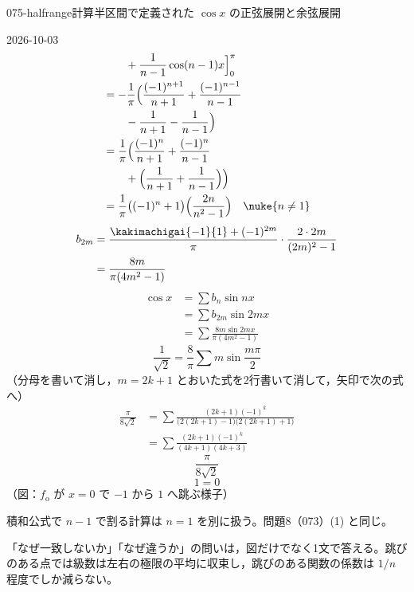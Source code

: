 \documentclass[uplatex,dvipdfmx,a4paper,11pt]{jsarticle}
\begin{document}
\begin{mondai}{075-halfrange}{計算}{半区間で定義された $\cos x$ の正弦展開と余弦展開}
\begin{kotaeutsushi}{2026-10-03}
\begin{align*}
  &\qquad+\frac{1}{n-1}\cos(n-1)x\Bigr]_{0}^{\pi}\\
  &=-\frac{1}{\pi}\Bigl(\frac{(-1)^{n+1}}{n+1}+\frac{(-1)^{n-1}}{n-1}\\
  &\qquad-\frac{1}{n+1}-\frac{1}{n-1}\Bigr)\\
  &=\frac{1}{\pi}\Bigl(\frac{(-1)^{n}}{n+1}+\frac{(-1)^{n}}{n-1}\\
  &\qquad+\Bigl(\frac{1}{n+1}+\frac{1}{n-1}\Bigr)\Bigr)\\
  &=\frac{1}{\pi}\bigl((-1)^{n}+1\bigr)\Bigl(\frac{2n}{n^{2}-1}\Bigr)\quad\nuke{n\neq1}
\end{align*}
\begin{align*}
  b_{2m}&=\frac{\kakimachigai{-1}{1}+(-1)^{2m}}{\pi}\cdot\frac{2\cdot2m}{(2m)^{2}-1}\\
  &=\frac{8m}{\pi(4m^{2}-1)}
\end{align*}
\begin{align*}
  \cos x&=\sum b_n\sin nx\\
  &=\sum b_{2m}\sin2mx\\
  &=\sum\frac{8m\sin2mx}{\pi(4m^{2}-1)}
\end{align*}
\[ \frac{1}{\sqrt{2}}=\frac{8}{\pi}\sum m\sin\frac{m\pi}{2} \]
（分母を書いて消し，$m=2k+1$ とおいた式を2行書いて消して，矢印で次の式へ）
\begin{align*}
  \frac{\pi}{8\sqrt{2}}&=\sum\frac{(2k+1)(-1)^{k}}{\bigl(2(2k+1)-1\bigr)\bigl(2(2k+1)+1\bigr)}\\
  &=\sum\frac{(2k+1)(-1)^{k}}{(4k+1)(4k+3)}
\end{align*}
\[ \frac{\pi}{8\sqrt{2}} \]
\[ 1=0 \]
（図：$f_{\mathrm{o}}$ が $x=0$ で $-1$ から $1$ へ跳ぶ様子）
\end{kotaeutsushi}
\begin{kizuki}
\item 積和公式で $n-1$ で割る計算は $n=1$ を別に扱う。問題8（073）(1) と同じ。
\item 「なぜ一致しないか」「なぜ違うか」の問いは，図だけでなく1文で答える。跳びのある点では級数は左右の極限の平均に収束し，跳びのある関数の係数は $1/n$ 程度でしか減らない。

\end{kizuki}
\end{mondai}
\end{document}
